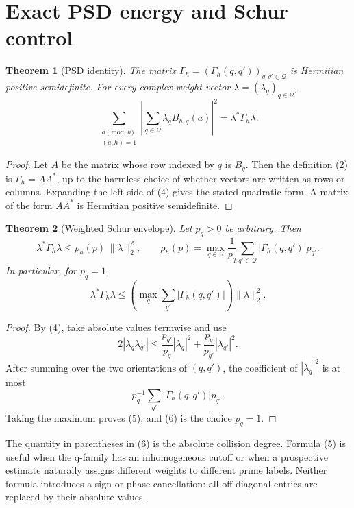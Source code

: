 \documentclass[11pt]{article}
\newtheorem{theorem}{Theorem}
\newcommand{\G}{\Gamma}
\begin{document}
\section{Exact PSD energy and Schur control}

\begin{theorem}[PSD identity]
The matrix $\G_h=(\G_h(q,q'))_{q,q'\in\mathcal Q}$ is Hermitian positive semidefinite.
For every complex weight vector $\lambda=(\lambda_q)_{q\in\mathcal Q}$,
\[
 \sum_{\substack{a\pmod h\\(a,h)=1}}
 \left|\sum_{q\in\mathcal Q}\lambda_q B_{h,q}(a)\right|^2
 =\lambda^{*}\G_h\lambda .
 \tag{4}
\]
\end{theorem}

\begin{proof}
Let $A$ be the matrix whose row indexed by $q$ is $B_q$.  Then the definition (2) is
$\G_h=AA^{*}$, up to the harmless choice of whether vectors are written as rows or columns.
Expanding the left side of (4) gives the stated quadratic form.  A matrix of the form
$AA^{*}$ is Hermitian positive semidefinite.
\end{proof}

\begin{theorem}[Weighted Schur envelope]
Let $p_q>0$ be arbitrary.  Then
\[
 \lambda^{*}\G_h\lambda
 \leq \rho_h(p)\,\|\lambda\|_2^2,
 \qquad
 \rho_h(p)=\max_{q\in\mathcal Q}
 \frac{1}{p_q}\sum_{q'\in\mathcal Q}|\G_h(q,q')|p_{q'}.
 \tag{5}
\]
In particular, for $p_q=1$,
\[
 \lambda^{*}\G_h\lambda
 \leq \left(\max_q\sum_{q'}|\G_h(q,q')|\right)\|\lambda\|_2^2.
 \tag{6}
\]
\end{theorem}

\begin{proof}
By (4), take absolute values termwise and use
\[
 2|\lambda_q\lambda_{q'}|
 \leq \frac{p_{q'}}{p_q}|\lambda_q|^2
      +\frac{p_q}{p_{q'}}|\lambda_{q'}|^2.
\]
After summing over the two orientations of $(q,q')$, the coefficient of
$|\lambda_q|^2$ is at most
\[
 p_q^{-1}\sum_{q'}|\G_h(q,q')|p_{q'}.
\]
Taking the maximum proves (5), and (6) is the choice $p_q=1$.
\end{proof}

The quantity in parentheses in (6) is the absolute collision degree.  Formula (5) is useful
when the q-family has an inhomogeneous cutoff or when a prospective estimate naturally
assigns different weights to different prime labels.  Neither formula introduces a sign or
phase cancellation: all off-diagonal entries are replaced by their absolute values.
\end{document}
